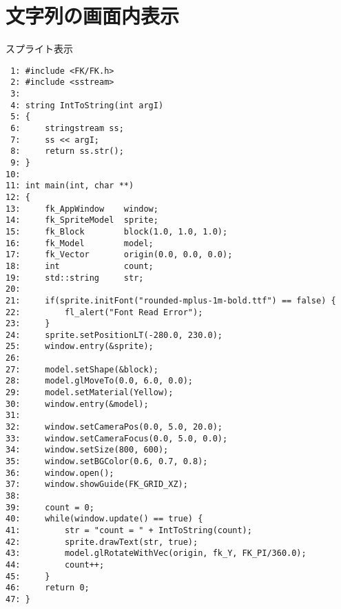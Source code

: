 \section{文字列の画面内表示} \label{sec:08-sprite}
\begin{itembox}[l]{スプライト表示}
\begin{small}
\begin{verbatim}
 1: #include <FK/FK.h>
 2: #include <sstream>
 3: 
 4: string IntToString(int argI)
 5: {
 6:     stringstream ss;
 7:     ss << argI;
 8:     return ss.str();
 9: }
10: 
11: int main(int, char **)
12: {
13:     fk_AppWindow    window;
14:     fk_SpriteModel  sprite;
15:     fk_Block        block(1.0, 1.0, 1.0);
16:     fk_Model        model;
17:     fk_Vector       origin(0.0, 0.0, 0.0);
18:     int             count;
19:     std::string     str;
20: 
21:     if(sprite.initFont("rounded-mplus-1m-bold.ttf") == false) {
22:         fl_alert("Font Read Error");
23:     }
24:     sprite.setPositionLT(-280.0, 230.0);
25:     window.entry(&sprite);
26: 
27:     model.setShape(&block);
28:     model.glMoveTo(0.0, 6.0, 0.0);
29:     model.setMaterial(Yellow);
30:     window.entry(&model);
31: 
32:     window.setCameraPos(0.0, 5.0, 20.0);
33:     window.setCameraFocus(0.0, 5.0, 0.0);
34:     window.setSize(800, 600);
35:     window.setBGColor(0.6, 0.7, 0.8);
36:     window.open();
37:     window.showGuide(FK_GRID_XZ);
38: 
39:     count = 0;
40:     while(window.update() == true) {
41:         str = "count = " + IntToString(count);
42:         sprite.drawText(str, true);
43:         model.glRotateWithVec(origin, fk_Y, FK_PI/360.0);
44:         count++;
45:     }
46:     return 0;
47: }
\end{verbatim}
\end{small}
\end{itembox}
